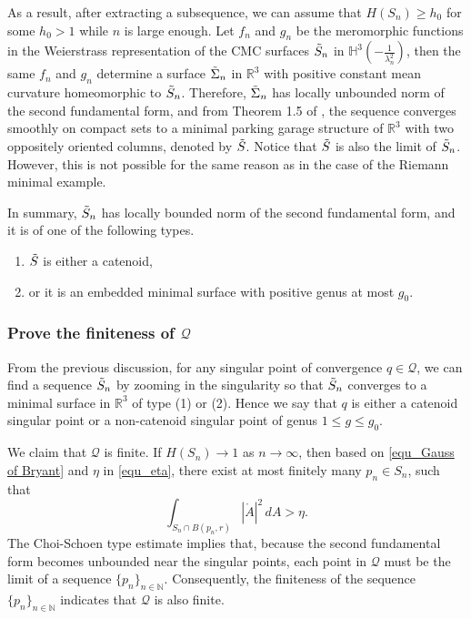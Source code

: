 \documentclass[12pt,a4paper]{amsart}
\numberwithin{equation}{section}
\theoremstyle{plain}
\theoremstyle{named}
\theoremstyle{definition}
\begin{document}
\begin{itemize}
        As a result, after extracting a subsequence, we can assume that $H(S_n)\geq h_0$ for some $h_0>1$ while $n$ is large enough.
        Let $f_n$ and $g_n$ be the meromorphic functions in the Weierstrass representation of the CMC surfaces $\Tilde{S}_n$ in $\mathbb{H}^3\left(-\frac{1}{\lambda_n^2}\right)$, then the same $f_n$ and $g_n$ determine a surface $\Tilde{\Sigma}_n$ in $\mathbb{R}^3$ with positive constant mean curvature homeomorphic to $\Tilde{S}_n$. Therefore, $\Tilde{\Sigma}_n$ has locally unbounded norm of the second fundamental form, and from Theorem 1.5 of \cite{Meeks-Tinaglia_classification}, the sequence converges smoothly on compact sets to a minimal parking garage structure of $\mathbb{R}^3$ with two oppositely oriented columns, denoted by $\Tilde{S}$. 
        Notice that $\Tilde{S}$ is also the limit of $\Tilde{S}_n$. However, this is not possible for the same reason as in the case of the Riemann minimal example.      
    \end{itemize}
    In summary, $\Tilde{S}_n$ has locally bounded norm of the second fundamental form, and it is of one of the following types. \begin{enumerate}
        \item $\Tilde{S}$ is either a catenoid,
        \item or it is an embedded minimal surface with positive genus at most $g_0$.
    \end{enumerate}


    

     \subsubsection{Prove the finiteness of $\mathcal{Q}$}\label{subsection_finiteness of singularities}
     
     From the previous discussion, for any singular point of convergence $q\in\mathcal{Q}$, we can find a sequence $\Tilde{S}_n$ by zooming in the singularity so that $\Tilde{S}_n$ converges to a minimal surface in $\mathbb{R}^3$ of type (1) or (2). Hence we say that $q$ is either a catenoid singular point or a non-catenoid singular point of genus $1\leq g\leq g_0$.
     
     We claim that $\mathcal{Q}$ is finite. If $H(S_n)\rightarrow 1$ as $n\rightarrow\infty$, then based on \eqref{equ_Gauss of Bryant} and $\eta$ in \eqref{equ_eta}, there exist at most finitely many $p_n\in S_n$, such that 
     \begin{equation*}
         \int_{S_n\cap B(p_n,r)}|\mathring{A}|^2\,dA>\eta.
     \end{equation*}
     The Choi-Schoen type estimate implies that, because the second fundamental form becomes unbounded near the singular points, each point in $\mathcal{Q}$ must be the limit of a sequence $\{p_n\}_{n\in\mathbb{N}}$. Consequently, the finiteness of the sequence $\{p_n\}_{n\in\mathbb{N}}$ indicates that $\mathcal{Q}$ is also finite.
     
\end{document}
